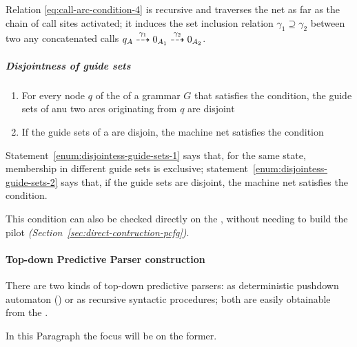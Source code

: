 \documentclass[english]{article}
\begin{document}
Relation \ref{eq:call-arc-condition-4} is recursive and traverses the net as far as the chain of call sites activated;
it induces the set inclusion relation \(\gamma_1 \supseteq \gamma_2\) between two any concatenated calls \(q_A \stackrel{\gamma_1}{\dashrightarrow} 0_{A_1} \stackrel{\gamma_2}{\dashrightarrow} 0_{A_2}\).

\subparagraph*{Disjointness of guide sets}

\begin{enumerate}[label=\arabic*., ref=(\arabic*)]
  \item\label{enum:disjointess-guide-sets-1} For every node \(q\) of the \PCFG of a grammar \(G\) that satisfies the \ello condition, the guide sets of anu two arcs originating from \(q\) are disjoint
  \item\label{enum:disjointess-guide-sets-2} If the guide sets of a \PCFG are disjoin, the machine net satisfies the \ello condition
\end{enumerate}

\bigskip
Statement~\ref{enum:disjointess-guide-sets-1} says that, for the same state, membership in different guide sets is exclusive;
statement~\ref{enum:disjointess-guide-sets-2} says that, if the guide sets are disjoint, the machine net satisfies the \ello condition.

This condition can also be checked directly on the \PCFG, without needing to build the \elro pilot \textit{(Section~\ref{sec:direct-contruction-pcfg})}.

\paragraph{Top-down Predictive Parser construction}
\label{par:top-down-predictive-parser-construction}

There are two kinds of top-down predictive parsers:
as deterministic pushdown automaton (\DPDA) or as recursive syntactic procedures;
both are easily obtainable from the \PCFG.

In this Paragraph the focus will be on the former.
\end{document}
